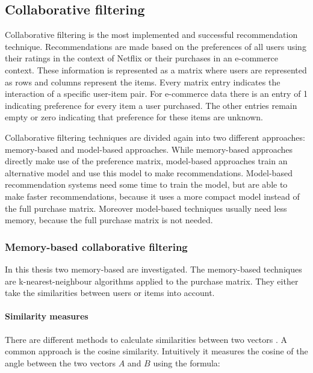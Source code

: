 \documentclass[10pt]{reportMaster}
\begin{document}
\subsection{Collaborative filtering}
\label{sec:collaborativeFiltering}
\label{rs_cf}

Collaborative filtering is the most implemented and successful recommendation technique.
Recommendations are made based on the preferences of all users using their ratings in the context of Netflix or their purchases in an e-commerce context.
These information is represented as a matrix where users are represented as rows and columns represent the items.
Every matrix entry indicates the interaction of a specific user-item pair.
For e-commerce data there is an entry of 1 indicating preference for every item a user purchased.
The other entries remain empty or zero indicating that preference for these items are unknown.

Collaborative filtering techniques are divided again into two different approaches: memory-based and model-based approaches.
While memory-based approaches directly make use of the preference matrix, model-based approaches train an alternative model and use this model to make recommendations.
Model-based recommendation systems need some time to train the model, but are able to make faster recommendations, because it uses a more compact model instead of the full purchase matrix.
Moreover model-based techniques usually need less memory, because the full purchase matrix is not needed.

\subsubsection{Memory-based collaborative filtering}
\label{sec:memBasedCF}

In this thesis two memory-based are investigated.
The memory-based techniques are k-nearest-neighbour algorithms applied to the purchase matrix.
They either take the similarities between users or items into account.

\paragraph{Similarity measures}
\label{par:simMeasures}
There are different methods to calculate similarities between two vectors \cite{dataMining}.
A common approach is the cosine similarity.
Intuitively it measures the cosine of the angle between the two vectors $A$ and $B$ using the formula:
\end{document}
